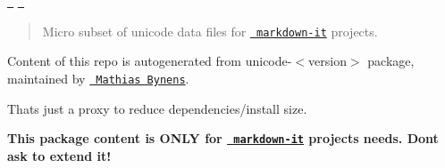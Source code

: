 \href{https://travis-ci.org/markdown-it/uc.micro}{\texttt{ }} \href{https://www.npmjs.org/package/uc.micro}{\texttt{ }}

\begin{quote}
Micro subset of unicode data files for \href{https://github.com/markdown-it}{\texttt{ markdown-\/it}} projects. \end{quote}


Content of this repo is autogenerated from {\ttfamily unicode-\/$<$version$>$} package, maintained by \href{https://github.com/mathiasbynens}{\texttt{ Mathias Bynens}}.

That\textquotesingle{}s just a proxy to reduce dependencies/install size.

{\bfseries{This package content is O\+N\+LY for \href{https://github.com/markdown-it}{\texttt{ markdown-\/it}} projects needs. Don\textquotesingle{}t ask to extend it!}} 